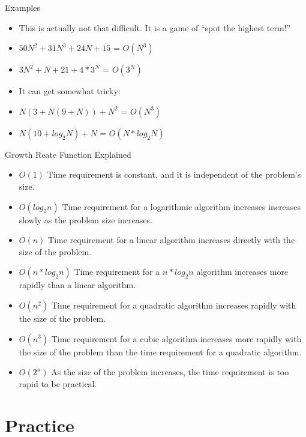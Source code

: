 \documentclass{beamer}
\begin{document}
\begin{frame}{Examples}
\begin{itemize}
\item This is actually not that difficult.  It is a game of ``spot the highest term!''
\item $50N^2 + 31N^3 + 24N + 15$ = $O(N^3)$ 
\item $3N^2 + N + 21 + 4*3^N$  = $O(3^N)$
\item It can get somewhat tricky:
\item $N(3 + N(9+N)) + N^2$ = $O(N^3)$
\item $N(10 + log_2N) + N$ = $O(N*log_2N)$
\end{itemize}
\end{frame}

\begin{frame}{Growth Reate Function Explained}
\begin{itemize}
\item $O(1)$             Time requirement is constant, and it is independent of the problem's size.
\item $O(log_2n)$      Time requirement for a logarithmic algorithm increases increases slowly
                 as the problem size increases.
\item $O(n)$      Time requirement for a linear algorithm increases directly with the size
                 of the problem.
\item $O(n*log_2n)$ Time requirement for a $n*log_2n$ algorithm increases more rapidly than
                 a linear algorithm.
\item $O(n^2)$       Time requirement for a quadratic algorithm increases rapidly with the
                 size of the problem.
\item $O(n^3)$       Time requirement for a cubic algorithm increases more rapidly with the
                 size of the problem than the time requirement for a quadratic algorithm.
\item $O(2^n)$      As the size of the problem increases, the time requirement is too rapid to be practical.
\end{itemize}
\end{frame}

\section{Practice}
\end{document}
